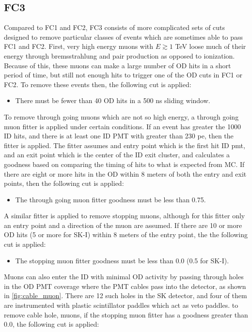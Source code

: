 \subsection{FC3}
Compared to FC1 and FC2, FC3 consists of more complicated sets of cuts designed to remove particular classes of events which are sometimes able to pass FC1 and FC2.  First, very high energy muons with $E\gtrsim1$ TeV loose much of their energy through bremsstrahlung and pair production as opposed to ionization.  Because of this, these muons can make a large number of OD hits in a short period of time, but still not enough hits to trigger one of the OD cuts in FC1 or FC2.  To remove these events then, the following cut is applied:
\begin{itemize}
\item There must be fewer than 40 OD hits in a 500 ns sliding window.
\end{itemize}
\par
To remove through going muons which are not so high energy, a through going muon fitter is applied under certain conditions.  If an event has greater the 1000 ID hits, and there is at least one ID PMT with greater than 230 pe, then the fitter is applied.   The fitter assumes and entry point which is the first hit ID pmt, and an exit point which is the center of the ID exit cluster, and calculates a goodness based on comparing the timing of hits to what is expected from MC.  If there are eight or more hits in the OD within 8 meters of both the entry and exit points, then the following cut is applied:
\begin{itemize}
\item The through going muon fitter goodness must be less than 0.75.
\end{itemize} 
\par
A similar fitter is applied to remove stopping muons, although for this fitter only an entry point and a direction of the muon are assumed.  If there are 10 or more OD hits (5 or more for SK-I) within 8 meters of the entry point, the the following cut is applied:
\begin{itemize}
\item The stopping muon fitter goodness must be less than 0.0 (0.5 for SK-I).
\end{itemize} 
\par
Muons can also enter the ID with minimal OD activity by passing through holes in the OD PMT coverage where the PMT cables pass into the detector, as shown in \cref{fig:cable_muon}.  There are 12 such holes in the SK detector, and four of them are instrumented with plastic scintillator paddles which act as veto paddles.  to remove cable hole, muons, if the stopping muon fitter has a goodness greater than 0.0, the following cut is applied:
